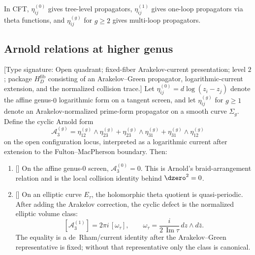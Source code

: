 \begin{remark}
\label{rem:physical-log-forms}
In CFT, $\eta_{ij}^{(0)}$ gives tree-level propagators, $\eta_{ij}^{(1)}$ gives one-loop propagators via theta functions, and $\eta_{ij}^{(g)}$ for $g \geq 2$ gives multi-loop propagators.
\end{remark}

\subsection{Arnold relations at higher genus}

\begin{theorem}
\label{thm:quantum-arnold-relations}
\label{thm:arnold-higher-genus}
\label{thm:arnold-quantum}
\textup{[Type signature: Open quadrant; fixed-fiber Arakelov-current
presentation; level $2$; package $H_D^{\mathrm{fib}}$ consisting of
an Arakelov--Green propagator, logarithmic-current extension, and the
normalized collision trace.]}
Let $\eta_{ij}^{(0)}=d\log(z_i-z_j)$ denote the affine
genus-$0$ logarithmic form on a tangent screen, and let
$\eta_{ij}^{(g)}$ for $g\ge1$ denote an Arakelov-normalized
prime-form propagator on a smooth curve $\Sigma_g$.
Define the cyclic Arnold form
\begin{equation}
\mathcal{A}_3^{(g)} = \eta_{12}^{(g)} \wedge \eta_{23}^{(g)} + \eta_{23}^{(g)} \wedge \eta_{31}^{(g)} + \eta_{31}^{(g)} \wedge \eta_{12}^{(g)}
\end{equation}
on the open configuration locus, interpreted as a logarithmic current
after extension to the Fulton--MacPherson boundary. Then:
\begin{enumerate}
\item[\textup{(a)}] \textup{[\ClaimStatusProvedHere]}
On the affine genus-$0$ screen,
$\mathcal{A}_3^{(0)}=0$. This is Arnold's braid-arrangement
relation and is the local collision identity behind
$\dzero^2=0$.

\item[\textup{(b)}] \textup{[\ClaimStatusConditional]}
On an elliptic curve $E_\tau$, the holomorphic theta quotient is
quasi-periodic. After adding the Arakelov correction, the cyclic
defect is the normalized elliptic volume class:
\[
[\mathcal{A}_3^{(1)}]
=
2\pi i\,[\omega_{\tau}],
\qquad
\omega_{\tau}=
\frac{i}{2\,\operatorname{Im}\tau}\,dz\wedge d\bar z .
\]
The equality is a de~Rham/current identity after the
Arakelov--Green representative is fixed; without that representative
only the class is canonical.


\end{enumerate}
\end{theorem}
